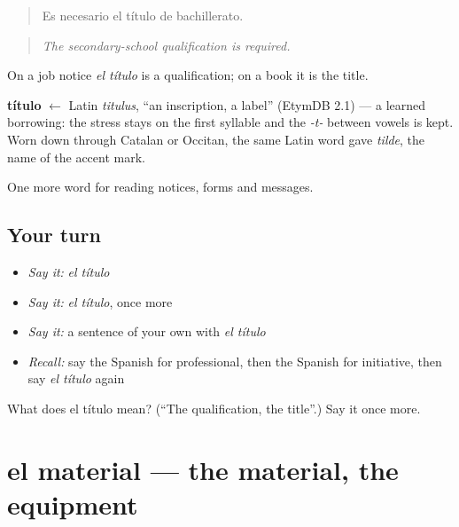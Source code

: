 \begin{quote}
Es necesario el título de bachillerato.
\end{quote}

\begin{quote}
\emph{The secondary-school qualification is required.}
\end{quote}

On a job notice \emph{el título} is a qualification; on a book it is the title.

\begin{cousinweb}
\textbf{título} $\leftarrow$ Latin \emph{titulus}, \textquotedblleft{}an inscription, a label\textquotedblright{} (EtymDB 2.1) — a learned borrowing: the stress stays on the first syllable and the \emph{-t-} between vowels is kept. Worn down through Catalan or Occitan, the same Latin word gave \emph{tilde}, the name of the accent mark.
\end{cousinweb}

\begin{grammarlens}[title={What you've built}]
One more word for reading notices, forms and messages.
\end{grammarlens}

\subsection*{Your turn}
\begin{itemize}
\raggedright
  \item \emph{Say it:} \emph{el título}
  \item \emph{Say it:} \emph{el título}, once more
  \item \emph{Say it:} a sentence of your own with \emph{el título}
  \item \emph{Recall:} say the Spanish for professional, then the Spanish for initiative, then say \emph{el título} again
\end{itemize}

\begin{tcolorbox}[breakable,colback=teal!4,colframe=teal!35!black,title={Before you move on}]
What does el título mean? (\textquotedblleft{}The qualification, the title\textquotedblright{}.) Say it once more.
\end{tcolorbox}
\section[el material]{el material — the material, the equipment}

